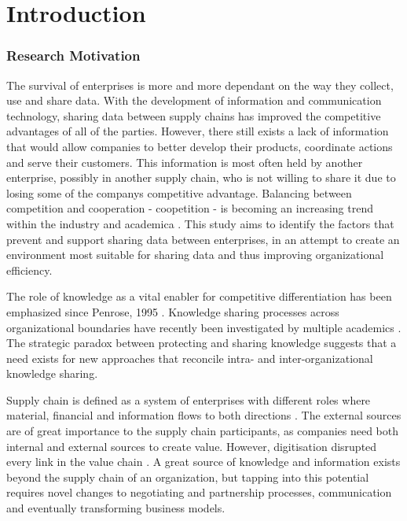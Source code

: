 \chapter{Introduction}
\label{chapter:intro}

\subsection{Research Motivation}

The survival of enterprises is more and more dependant on the way they collect, use and share data. With the development of information and communication technology, sharing data between supply chains has improved the competitive advantages of all of the parties. However, there still exists a lack of information that would allow companies to better develop their products, coordinate actions and serve their customers. This information is most often held by another enterprise, possibly in another supply chain, who is not willing to share it due to losing some of the companys competitive advantage. Balancing between competition and cooperation - coopetition - is becoming an increasing trend within the industry and academica \cite{}. This study aims to identify the factors that prevent and support sharing data between enterprises, in an attempt to create an environment most suitable for sharing data and thus improving organizational efficiency.

The role of knowledge as a vital enabler for competitive differentiation has been emphasized since Penrose, 1995 \cite{penrose1995theory}. Knowledge sharing processes across organizational boundaries have recently been investigated by multiple academics \cite{loebbecke2016managing, chiu2006understanding, loebecke1999co}. The strategic paradox between protecting and sharing knowledge suggests that a need exists for new approaches that reconcile intra- and inter-organizational knowledge sharing. 

Supply chain is defined as a system of enterprises with different roles where material, financial and information flows to both directions \cite{fiala2005information}. The external sources are of great importance to the supply chain participants, as companies need both internal and external sources to create value. However, digitisation disrupted every link in the value chain \cite{chesbrough2007business}. A great source of knowledge and information exists beyond the supply chain of an organization, but tapping into this potential requires novel changes to negotiating and partnership processes, communication and eventually transforming business models. 

